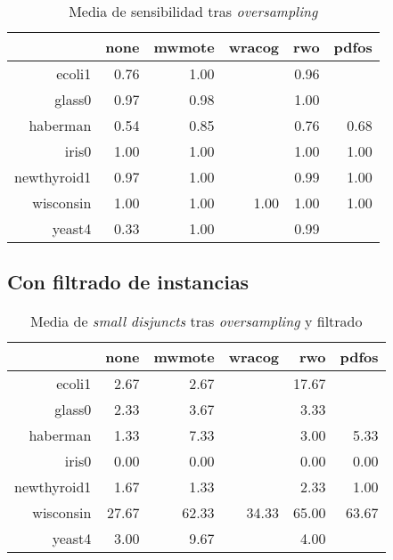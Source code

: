   \begin{table}[H]
  \centering
  \begin{tabular}{rrrrrr}
  \hline
  & none & mwmote & wracog & rwo & pdfos \\ 
  \hline
  ecoli1 & 0.76 & 1.00 &  & 0.96 &  \\ 
  glass0 & 0.97 & 0.98 &  & 1.00 &  \\ 
  haberman & 0.54 & 0.85 &  & 0.76 & 0.68 \\ 
  iris0 & 1.00 & 1.00 &  & 1.00 & 1.00 \\ 
  newthyroid1 & 0.97 & 1.00 &  & 0.99 & 1.00 \\ 
  wisconsin & 1.00 & 1.00 & 1.00 & 1.00 & 1.00 \\ 
  yeast4 & 0.33 & 1.00 &  & 0.99 &  \\ 
  \hline
  \end{tabular}
  \caption{Media de sensibilidad tras \textit{oversampling}}
  \end{table}
  
  
\subsection{Con filtrado de instancias}
  \begin{table}[H]
  \centering
  \begin{tabular}{rrrrrr}
  \hline
  & none & mwmote & wracog & rwo & pdfos \\ 
  \hline
  ecoli1 & 2.67 & 2.67 &  & 17.67 &  \\ 
  glass0 & 2.33 & 3.67 &  & 3.33 &  \\ 
  haberman & 1.33 & 7.33 &  & 3.00 & 5.33 \\ 
  iris0 & 0.00 & 0.00 &  & 0.00 & 0.00 \\ 
  newthyroid1 & 1.67 & 1.33 &  & 2.33 & 1.00 \\ 
  wisconsin & 27.67 & 62.33 & 34.33 & 65.00 & 63.67 \\ 
  yeast4 & 3.00 & 9.67 &  & 4.00 &  \\ 
  \hline
  \end{tabular}
  \caption{Media de \textit{small disjuncts} tras \textit{oversampling} y filtrado}
  \end{table}

